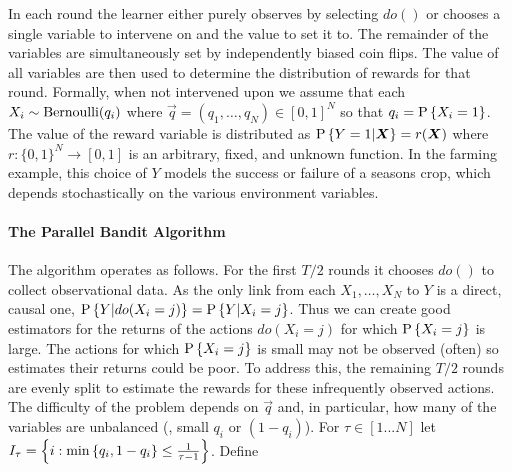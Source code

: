In each round the learner either purely observes by selecting $do()$ or chooses a single variable to intervene on and the value to set it to. 
The remainder of the variables are simultaneously set by independently biased coin flips. 
The value of all variables are then used to determine the distribution of rewards for that round.
Formally, when not intervened upon we assume that each $X_i \sim \bernoulli(q_i)$ where $\vec{q} = (q_1, \ldots, q_N) \in [0,1]^N$ so that $q_i = \P{X_i = 1}$.
The value of the reward variable is distributed as $\P{Y = 1|\vec{X}} = r(\vec{X})$ where 
$r : \{0,1\}^N \to [0,1]$ is an arbitrary, fixed, and unknown function. 
In the farming example, this choice of $Y$ models the success or failure of a seasons crop, which depends stochastically on the various environment variables.


\paragraph{The Parallel Bandit Algorithm}

The algorithm operates as follows. For the first $T/2$ rounds it chooses $do()$ to collect observational data. As the only link from each $X_1,\ldots,X_N$ to $Y$ is a direct, causal one, $\P{Y|do(X_i=j)}=\P{Y|X_i=j}$. Thus we can create good estimators for the returns of the actions $do(X_i = j)$ for which $\P{X_i = j}$ is large. The actions for which $\P{X_i = j}$ is small may not be observed (often) so  estimates their returns could be poor. To address this, the remaining $T/2$ rounds are evenly split to estimate the rewards for these infrequently observed actions. The difficulty of the problem depends on $\vec{q}$ and, in particular, how many of the variables are unbalanced (\ie, small $q_i$ or $(1-q_i)$). For $\tau \in [1...N]$ let $I_\tau = \set{ i : \min\set{q_i, 1-q_i} \leq \frac{1}{\tau - 1}}$. Define

